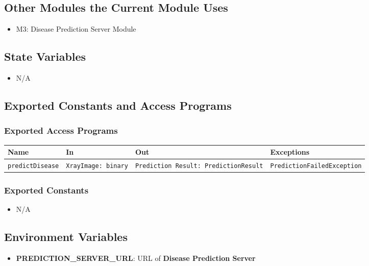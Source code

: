 \documentclass[12pt, titlepage]{article}
\begin{document}
\subsection{Other Modules the Current Module Uses}
\begin{itemize}
    \item M3: Disease Prediction Server Module
\end{itemize}

\subsection{State Variables}
\begin{itemize}
    \item N/A
\end{itemize}

\subsection{Exported Constants and Access Programs}
\subsubsection{Exported Access Programs}
\begin{tabular}{|l|p{3cm}|p{5cm}|p{5.5cm}|}
    \hline
    \textbf{Name} & \textbf{In} & \textbf{Out} & \textbf{Exceptions} \\
    \hline
    \texttt{predictDisease} & \texttt{XrayImage: binary} & \texttt{Prediction Result: PredictionResult} & \texttt{PredictionFailedException} \\
    \hline
\end{tabular}

\subsubsection{Exported Constants}
\begin{itemize}
    \item N/A
\end{itemize}

\subsection{Environment Variables}
\begin{itemize}
  \item \textbf{PREDICTION\_SERVER\_URL}: URL of \textbf{Disease Prediction Server}
\end{itemize}
\end{document}
